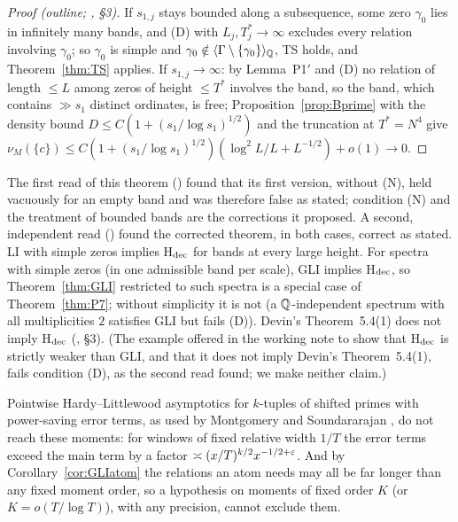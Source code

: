 \begin{proof}[Proof (outline; , \S3)]
If $s_{1,j}$ stays bounded along a subsequence, some zero $\gamma_0$ lies in infinitely many bands, and (D) with $L_j,T^*_j\to\infty$ excludes every relation involving $\gamma_0$; so $\gamma_0$ is simple and $\gamma_0\notin\langle\Gamma\setminus\{\gamma_0\}\rangle_{\mathbb Q}$, TS holds, and Theorem~\ref{thm:TS} applies. If $s_{1,j}\to\infty$: by Lemma~P1$'$ and (D) no relation of length $\le L$ among zeros of height $\le T^*$ involves the band, so the band, which contains $\gg s_1$ distinct ordinates, is free; Proposition~\ref{prop:Bprime} with the density bound $D\le C(1+(s_1/\log s_1)^{1/2})$ and the truncation at $T^*=N^4$ give $\nu_M(\{c\})\le C(1+(s_1/\log s_1)^{1/2})(\log^2L/L+L^{-1/2})+o(1)\to0$.
\end{proof}

The first read of this theorem () found that its first version, without (N), held vacuously for an empty band and was therefore false as stated; condition (N) and the treatment of bounded bands are the corrections it proposed. A second, independent read () found the corrected theorem, in both cases, correct as stated. LI with simple zeros implies H$_{\rm dec}$ for bands at every large height. For spectra with simple zeros (in one admissible band per scale), GLI implies H$_{\rm dec}$, so Theorem~\ref{thm:GLI} restricted to such spectra is a special case of Theorem~\ref{thm:P7}; without simplicity it is not (a $\mathbb Q$-independent spectrum with all multiplicities $2$ satisfies GLI but fails (D)). Devin's Theorem~5.4(1) does not imply H$_{\rm dec}$ (, \S3). (The example offered in the working note to show that H$_{\rm dec}$ is strictly weaker than GLI, and that it does not imply Devin's Theorem~5.4(1), fails condition (D), as the second read found; we make neither claim.)

\begin{remark}
Pointwise Hardy--Littlewood asymptotics for $k$-tuples of shifted primes with power-saving error terms, as used by Montgomery and Soundararajan \cite{MS}, do not reach these moments: for windows of fixed relative width $1/T$ the error terms exceed the main term by a factor $\asymp(x/T)^{k/2}x^{-1/2+\varepsilon}$. And by Corollary~\ref{cor:GLIatom} the relations an atom needs may all be far longer than any fixed moment order, so a hypothesis on moments of fixed order $K$ (or $K=o(T/\log T)$), with any precision, cannot exclude them.
\end{remark}
